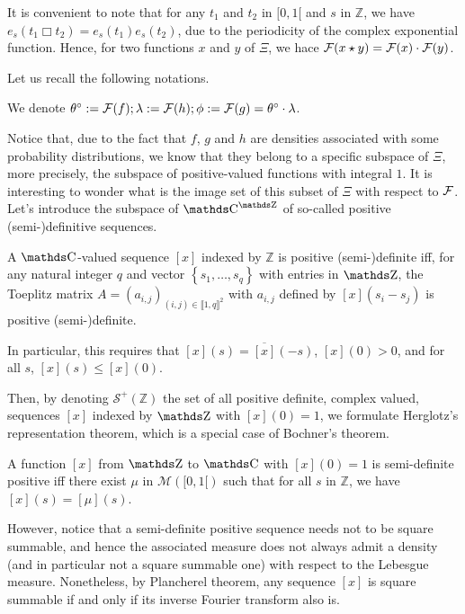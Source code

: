 \begin{rmk}\label{RMK_INTRO_CIRCULARDECONVOLUTION_PERIOD}
It is convenient to note that for any $t_{1}$ and $t_{2}$ in $[0, 1[$ and $s$ in $\mathds{Z}$, we have $e_{s}(t_{1} \Box t_{2}) = e_{s}(t_{1})e_{s}(t_{2})$, due to the periodicity of the complex exponential function.
Hence, for two functions $x$ and $y$ of $\Xi$, we hace $\operatorname{\mathcal{F}}(x \star y) = \operatorname{\mathcal{F}}(x) \cdot \operatorname{\mathcal{F}}(y)$.
\end{rmk}

Let us recall the following notations.
\begin{nota}\label{NOTA_INTRO_CIRCULARDECONVOLUTION_FOURIERTRANSFORM}
We denote $\theta^{\circ} := \operatorname{\mathcal{F}}(f); \lambda := \operatorname{\mathcal{F}}(h); \phi := \operatorname{\mathcal{F}}(g) = \theta^{\circ} \cdot \lambda$.
\end{nota}


Notice that, due to the fact that $f$, $g$ and $h$ are densities associated with some probability distributions, we know that they belong to a specific subspace of $\Xi$, more precisely, the subspace of positive-valued functions with integral $1$.
It is interesting to wonder what is the image set of this subset of $\Xi$ with respect to $\operatorname{\mathcal{F}}$.
Let's introduce the subspace of $\C^{\Z}$ of so-called positive (semi-)definitive sequences.

\begin{de}\label{DE_INTRO_CIRCULARDECONVOLUTION_SEMIDEF}
A $\C$-valued sequence $[x]$ indexed by $\mathds{Z}$ is positive (semi-)definite iff, for any natural integer $q$ and vector $\left\{s_{1}, \hdots, s_{q}\right\}$ with entries in $\Z$, the Toeplitz matrix $A=(a_{i,j})_{(i,j) \in \llbracket 1, q \rrbracket^{2}}$ with $a_{i,j}$ defined by $[x](s_{i} - s_{j})$ is positive (semi-)definite.

In particular, this requires that $[x](s) = \overline{[x]}(-s)$, $[x](0) > 0$, and for all $s$, $[x](s) \leq [x](0)$.
\assEnd
\end{de}
Then, by denoting $\mathcal{S}^{+}(\mathds{Z})$ the set of all positive definite, complex valued, sequences $[x]$ indexed by $\Z$ with $[x](0)=1$, we formulate Herglotz's representation theorem, which is a special case of Bochner's theorem.
\begin{thm}\label{THM_INTRO_CIRCULARDECONVOLUTION_HERGLOTZ}
A function $[x]$ from $\Z$ to $\C$ with $[x](0) = 1$ is semi-definite positive iff there exist $\mu$ in $\mathcal{M}([0, 1[)$ such that for all $s$ in $\mathds{Z}$, we have $[x](s) = [\mu](s)$.
\reEnd
\end{thm}
However, notice that a semi-definite positive sequence needs not to be square summable, and hence the associated measure does not always admit a density (and in particular not a square summable one) with respect to the Lebesgue measure.
Nonetheless, by Plancherel theorem, any sequence $[x]$ is square summable if and only if its inverse Fourier transform also is.

